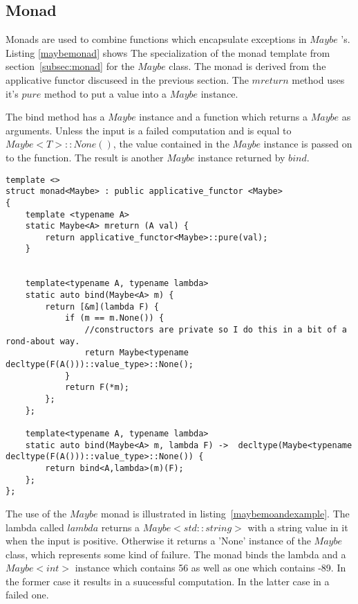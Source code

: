 \documentclass[12pt,fleqn]{article}
\begin{document}
%
\subsection{Monad}
%

Monads are used to combine functions which encapsulate exceptions in $Maybe$ 's.
Listing \ref{maybemonad} shows The specialization of the monad template from section~\ref{subsec:monad} for the $Maybe$ class. 
The monad is derived from the applicative functor discuseed in the previous section.
The $mreturn$ method uses it's $pure$ method to put a value into a $Maybe$ instance.

The bind method has a $Maybe$ instance and a function which returns a $Maybe$ as arguments.
Unless the input is a failed computation and  is equal to $Maybe<T>::None()$, the value contained in the $Maybe$ instance is passed on to the function.
The result is another $Maybe$ instance returned by $bind$.


%
%
\begin{minipage}{\linewidth}
\begin{lstlisting}[caption=Maybe monad, label=maybemonad]
template <> 
struct monad<Maybe> : public applicative_functor <Maybe>
{
	template <typename A> 
	static Maybe<A> mreturn (A val) {
		return applicative_functor<Maybe>::pure(val);
	}


	template<typename A, typename lambda>
	static auto bind(Maybe<A> m) {
		return [&m](lambda F) {
			if (m == m.None()) {
				//constructors are private so I do this in a bit of a rond-about way.
				return Maybe<typename decltype(F(A()))::value_type>::None();
			}
			return F(*m);		
		};
	};

	template<typename A, typename lambda>
	static auto bind(Maybe<A> m, lambda F) ->  decltype(Maybe<typename decltype(F(A()))::value_type>::None()) {
		return bind<A,lambda>(m)(F);
	};
};

\end{lstlisting}
\end{minipage}
%
%
%

The use of the $Maybe$ monad is illustrated in listing~\ref{maybemoandexample}.
The lambda called $lambda$ returns a $Maybe<std::string>$ with a string value in it when the input is positive.
Otherwise it returns a 'None' instance of the $Maybe$ class, which represents some kind of failure.
The monad binds the lambda and a $Maybe<int>$ instance which contains 56 as well as one which contains -89.
In the former case it results in a suucessful computation.
In the latter case in a failed one.
\end{document}
